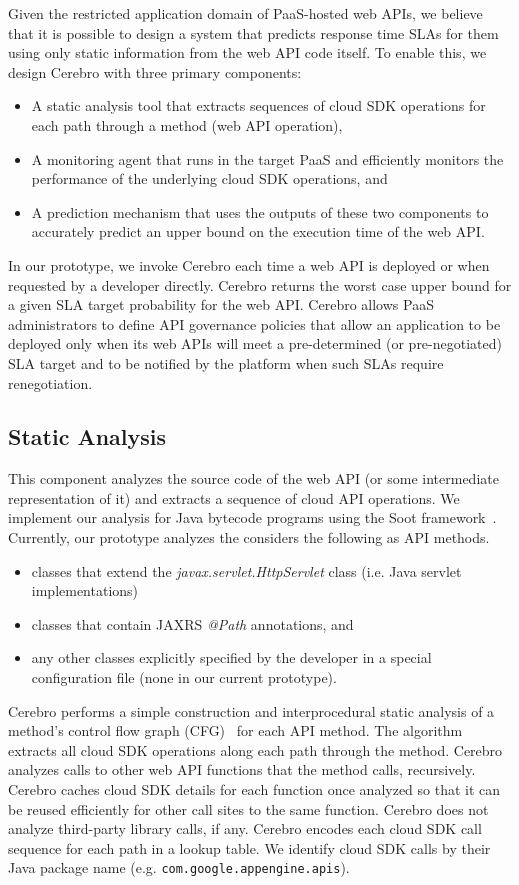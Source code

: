 Given the restricted application domain of PaaS-hosted web APIs, 
we believe that it is possible
to design a system that predicts response time SLAs for them using only
static information from the web API code itself.  To enable this, we design Cerebro
with three primary components:
\begin{itemize}
\item A static analysis tool that extracts sequences of cloud SDK operations for 
each path through a method (web API operation),
\item A monitoring agent that runs in the target PaaS and efficiently monitors 
the performance of the underlying cloud SDK operations, and
\item A prediction mechanism that uses the outputs of these two components to accurately predict an upper bound on the execution time of the web API.
\end{itemize}
In our prototype, we invoke Cerebro each time a web API is deployed or when requested
by a developer directly. Cerebro returns the worst case upper bound for a 
given SLA target probability for the web API.  
Cerebro allows PaaS administrators to define API governance policies that 
allow an application to be deployed only when its web APIs will meet a 
pre-determined (or pre-negotiated) SLA target and to be notified 
by the platform when such SLAs require renegotiation.

\subsection{Static Analysis}
 This component analyzes the source code of the web API
(or some intermediate representation of it) and extracts a sequence of cloud API operations.
We implement our analysis for Java bytecode programs
using the Soot framework~\cite{Vallee-Rai:2010:SJB:1925805.1925818}.
Currently, our prototype analyzes the considers the 
following as API methods.
\begin{itemize}
\item classes that extend the \textit{javax.servlet.HttpServlet} class (i.e. Java servlet implementations)
\item classes that contain JAXRS \textit{@Path} annotations, and
\item any other classes explicitly specified by the developer in a special configuration file (none in our current prototype).
\end{itemize}

Cerebro performs a simple construction and interprocedural static analysis 
of a method's control flow graph 
(CFG)~\cite{Allen:1970:CFA:800028.808479,Aho:1986:CPT:6448,Morgan:1998:BOC:288765,Muchnick:1998:ACD:286076} for each API method.
The algorithm extracts all cloud SDK operations along
each path through the method.  Cerebro analyzes calls to other web API functions
that the method calls, recursively.  Cerebro caches cloud SDK details for each function 
once analyzed so that it can be reused efficiently for other call sites to the same
function. Cerebro does not analyze third-party library calls, if any.  Cerebro encodes
each cloud SDK call sequence for each path in a lookup table. We identify
cloud SDK calls by their Java package name (e.g. \texttt{com.google.appengine.apis}).

